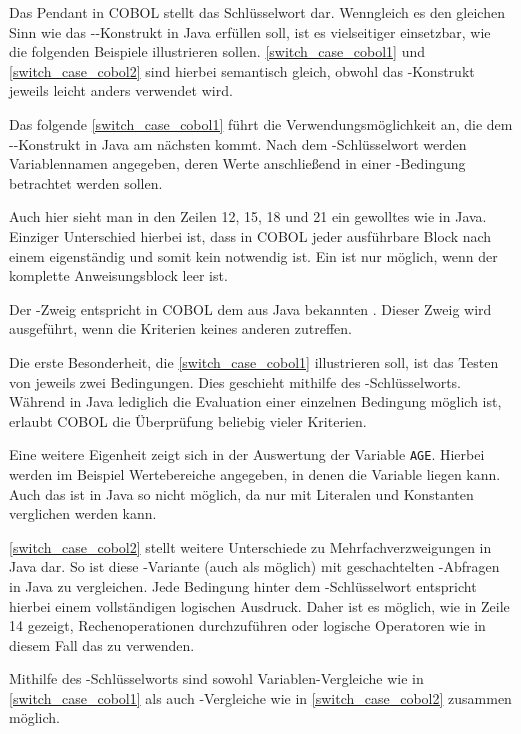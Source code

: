 Das Pendant in COBOL stellt das Schlüsselwort  dar. Wenngleich es den gleichen Sinn wie das --Konstrukt in Java erfüllen soll, ist es vielseitiger einsetzbar, wie die folgenden Beispiele illustrieren sollen. \autoref{switch_case_cobol1} und \autoref{switch_case_cobol2} sind hierbei semantisch gleich, obwohl das -Konstrukt jeweils leicht anders verwendet wird.

Das folgende \autoref{switch_case_cobol1} führt die Verwendungsmöglichkeit an, die dem --Konstrukt in Java am nächsten kommt. Nach dem -Schlüsselwort werden Variablennamen angegeben, deren Werte anschließend in einer -Bedingung betrachtet werden sollen.

Auch hier sieht man in den Zeilen 12, 15, 18 und 21 ein gewolltes  wie in Java. Einziger Unterschied hierbei ist, dass in COBOL jeder ausführbare Block nach einem  eigenständig und somit kein  notwendig ist. Ein  ist nur möglich, wenn der komplette Anweisungsblock leer ist. 

Der -Zweig entspricht in COBOL dem aus Java bekannten . Dieser Zweig wird ausgeführt, wenn die Kriterien keines anderen zutreffen.

Die erste Besonderheit, die \autoref{switch_case_cobol1} illustrieren soll, ist das Testen von jeweils zwei Bedingungen. Dies geschieht mithilfe des -Schlüsselworts. Während in Java lediglich die Evaluation einer einzelnen Bedingung möglich ist, erlaubt COBOL die Überprüfung beliebig vieler Kriterien.


Eine weitere Eigenheit zeigt sich in der Auswertung der Variable \texttt{AGE}. Hierbei werden im Beispiel Wertebereiche angegeben, in denen die Variable liegen kann. Auch das ist in Java so nicht möglich, da nur mit Literalen und Konstanten verglichen werden kann.

\autoref{switch_case_cobol2} stellt weitere Unterschiede zu Mehrfachverzweigungen in Java dar. So ist diese -Variante (auch als  möglich) mit geschachtelten -Abfragen in Java zu vergleichen. Jede Bedingung hinter dem -Schlüsselwort entspricht hierbei einem vollständigen logischen Ausdruck. Daher ist es möglich, wie in Zeile 14 gezeigt, Rechenoperationen durchzuführen oder logische Operatoren wie in diesem Fall das  zu verwenden. 


Mithilfe des -Schlüsselworts sind sowohl Variablen-Vergleiche wie in \autoref{switch_case_cobol1} als auch -Vergleiche wie in \autoref{switch_case_cobol2} zusammen möglich.